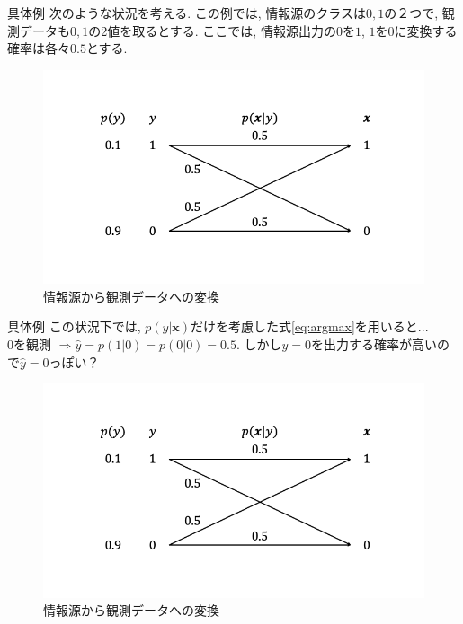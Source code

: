 \documentclass[aspectratio=43, dvipdfmx, 12pt]{beamer}
\newcommand{\vek}[1]{\bm{#1}} %
\begin{document}
\begin{frame}{具体例}
  次のような状況を考える. この例では, 情報源のクラスは$0, 1$の２つで, 観測データも$0, 1$の2値を取るとする. 
  ここでは, 情報源出力の$0$を$1$, $1$を$0$に変換する確率は各々$0.5$とする.
  \begin{figure}[h]
    \begin{center}
      \includegraphics[scale=0.3]{./images/ML-lect1-1.png}
      \caption{情報源から観測データへの変換}
    \end{center}
  \end{figure}

\end{frame}

\begin{frame}{具体例}
  この状況下では, $p(y|\vek{x})$だけを考慮した式\ref{eq:argmax}を用いると...\\
  $0$を観測 $\Rightarrow \hat{y} = p(1|0) = p(0|0) = 0.5$. しかし$y=0$を出力する確率が高いので$\hat{y} = 0$っぽい？
  \begin{figure}[h]
    \begin{center}
      \includegraphics[scale=0.3]{./images/ML-lect1-1.png}
      \caption{情報源から観測データへの変換}
    \end{center}
  \end{figure}
\end{frame}
\end{document}
